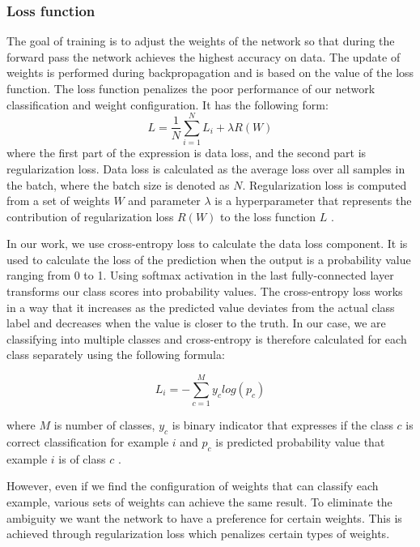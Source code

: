 \subsubsection{Loss function}

The goal of training is to adjust the weights of the network so that during the forward pass the network achieves the highest accuracy on data. The update of weights is performed during backpropagation and is based on the value of the loss function. The loss function penalizes the poor performance of our network classification and weight configuration. It has the following form: 
\begin{equation}
    L = \frac{1}{N} \sum_{i=1}^{N} L_{i} + \lambda R(W)
\end{equation}
where the first part of the expression is data loss, and the second part is regularization loss. Data loss is calculated as the average loss over all samples in the batch, where the batch size is denoted as $N$. Regularization loss is computed from a set of weights $W$ and parameter $\lambda$ is a hyperparameter that represents the contribution of regularization loss $R(W)$ to the loss function $L$ \cite{standford}.

In our work, we use cross-entropy loss to calculate the data loss component. It is used to calculate the loss of the prediction when the output is a probability value ranging from 0 to 1. Using softmax activation in the last fully-connected layer transforms our class scores into probability values. The cross-entropy loss works in a way that it increases as the predicted value deviates from the actual class label and decreases when the value is closer to the truth. In our case, we are classifying into multiple classes and cross-entropy is therefore calculated for each class separately using the following formula: 

\begin{equation}
    L_i = - \sum_{c=1}^{M} y_c log(p_c)
\end{equation}

where $M$ is number of classes, $y_c$ is binary indicator that expresses if the class $c$ is correct classification for example $i$ and $p_c$ is predicted probability value that example $i$ is of class $c$ \cite{standford}.

However, even if we find the configuration of weights that can classify each example, various sets of weights can achieve the same result. To eliminate the ambiguity we want the network to have a preference for certain weights. This is achieved through regularization loss which penalizes certain types of weights. 

